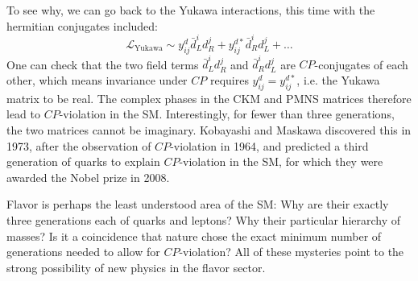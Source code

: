To see why, we can go back to the Yukawa interactions, this time with the hermitian conjugates included:
\begin{equation}
	\label{eq:01_sm_ew_yukawa_hermitian}
	\mathcal{L}_{\mathrm{Yukawa}} \sim y^d_{ij} \bar d^i_L d^j_R + y^{d*}_{ij} \bar d^i_R d^j_L + \ldots
\end{equation}
One can check that the two field terms $\bar d^i_L d^j_R$ and $\bar d^i_R d^j_L$ are $CP$-conjugates of each other, which means invariance under $CP$ requires $y^d_{ij} = y^{d*}_{ij}$, i.e. the Yukawa matrix to be real.
The complex phases in the CKM and PMNS matrices therefore lead to $CP$-violation in the SM.
Interestingly, for fewer than three generations, the two matrices cannot be imaginary.
Kobayashi and Maskawa discovered this in 1973, after the observation of $CP$-violation in 1964, and predicted a third generation of quarks to explain $CP$-violation in the SM, for which they were awarded the Nobel prize in 2008.

Flavor is perhaps the least understood area of the SM:
Why are their exactly three generations each of quarks and leptons? 
Why their particular hierarchy of masses?
Is it a coincidence that nature chose the exact minimum number of generations needed to allow for $CP$-violation?
All of these mysteries point to the strong possibility of new physics in the flavor sector.





